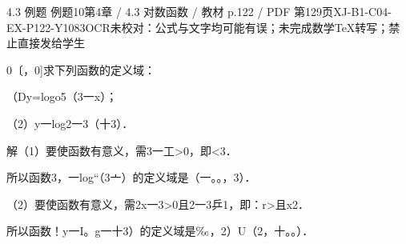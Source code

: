 \begin{bankitem}{4.3 例题 例题10}{第4章 / 4.3 对数函数 / 教材 p.122 / PDF 第129页}{XJ-B1-C04-EX-P122-Y1083}{OCR未校对：公式与文字均可能有误；未完成数学TeX转写；禁止直接发给学生}
\begin{ocrdraft}
\par
0〔，0]求下列函数的定义域：
\par
（Dy=logo5（3一x）；
\par
（2）y一log2一3（十3）．
\par
解（1）要使函数有意义，需3一工>0，即<3．
\par
所以函数3，一log“（3亠）的定义域是（一。。，3）．
\par
（2）要使函数有意义，需2x一3>0且2一3乒1，即：r>且x2．
\par
所以函数！y一I。g一十3）的定义域是\ensuremath{\text{\textperthousand}}，2）U（2，十。。）．
\end{ocrdraft}
\end{bankitem}
